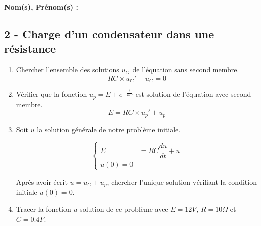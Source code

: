 \documentclass[12pt]{article}
\begin{document}

\setlength{\columnseprule}{1pt}

\textbf{Nom(s), Prénom(s) :}

\subsection*{2 - Charge d'un condensateur dans une résistance}



\begin{enumerate}
\item Chercher l'ensemble des solutions $u_G$ de l'équation sans second membre.
  $$ RC \times u_G' + u_G = 0 $$
\item Vérifier que la fonction $u_p = E + e^{-\frac{t}{RC}}$ est solution de l'équation avec second membre. 
  $$E = RC \times u_p' + u_p$$

\item Soit $u$ la solution générale de notre problème initiale.

  \begin{equation*}
    \left\lbrace
    \begin{array}{ccc}
      E &= RC\dfrac{du}{dt} + u\\
      u(0) = 0
    \end{array}\right.
  \end{equation*}


  Après avoir écrit $u = u_G + u_p$, chercher l'unique solution vérifiant la condition initiale $u(0) = 0$. 
\item Tracer la fonction $u$ solution de ce problème avec $E = 12V$, $R = 10\Omega$ et $C = 0.4F$.
\end{enumerate}
\end{document}
